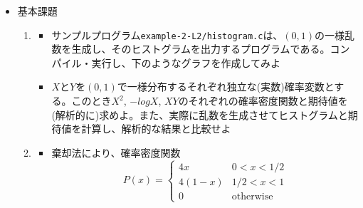 \documentclass[11pt]{jarticle}
\begin{document}
\begin{itemize}
\item 基本課題
  \begin{enumerate}
  \item
    \begin{itemize}
    \item サンプルプログラム{\tt example-2-L2/histogram.c}は、$(0,1)$の一様乱数を生成し、そのヒストグラムを出力するプログラムである。コンパイル・実行し、下のようなグラフを作成してみよ
      \begin{center}
      \end{center}
    \item $X$と$Y$を$(0,1)$で一様分布するそれぞれ独立な(実数)確率変数とする。このとき$X^2$, $-log X$, $XY$のそれぞれの確率密度関数と期待値を(解析的に)求めよ。また、実際に乱数を生成させてヒストグラムと期待値を計算し、解析的な結果と比較せよ
    \end{itemize}
    \item 
    \begin{itemize}
    \item 棄却法により、確率密度関数
      \begin{equation}
        P(x) = \begin{cases} 4x & 0 < x < 1/2 \\
          4(1-x) & 1/2 < x < 1 \\
          0 & \text{otherwise}
        \end{cases}

\end{equation}
\end{itemize}
\end{enumerate}
\end{itemize}
\end{document}
